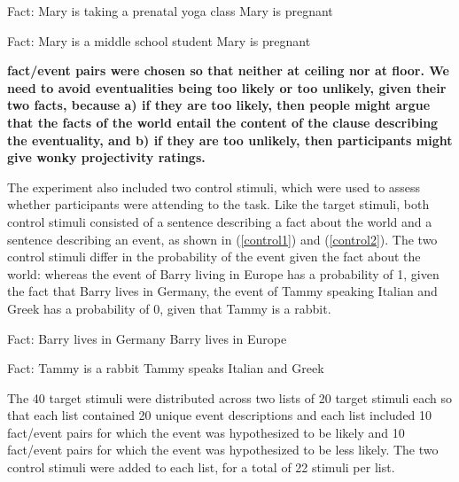 \documentclass[11pt,fleqn]{article}
\newcommand{\6}{\mbox{$[\hspace*{-.6mm}[$}}
\newcommand{\9}{\mbox{$]\hspace*{-.6mm}]$}}
\begin{document}
\begin{exe}
\ex\label{event}
\begin{xlist}
\ex\label{event1}
\begin{xlist}
\ex Fact: Mary is taking a prenatal yoga class
\ex Mary is pregnant
\end{xlist}
\ex\label{event2}
\begin{xlist}
\ex Fact: Mary is a middle school student
\ex Mary is pregnant
\end{xlist}
\end{xlist}
\end{exe}

{\bf fact/event pairs were chosen so that neither at ceiling nor at floor. We need to avoid eventualities being too likely or too unlikely, given their two facts, because a) if they are too likely, then people might argue that the facts of the world entail the content of the clause describing the eventuality, and b) if they are too unlikely, then participants might give wonky projectivity ratings.}

The experiment also included two control stimuli, which were used to assess whether participants were attending to the task. Like the target stimuli, both control stimuli consisted of a sentence describing a fact about the world and a sentence describing an event, as shown in (\ref{control1}) and (\ref{control2}). The two control stimuli differ in the probability of the event given the fact about the world: whereas the event of Barry living in Europe has a probability of 1, given the fact that Barry lives in Germany, the event of Tammy speaking Italian and Greek has a probability of 0, given that Tammy is a rabbit. 

\begin{exe}
\ex\label{control1}
\begin{xlist}
 Fact: Barry lives in Germany 
 Barry lives in Europe 
\end{xlist}
\ex\label{control2}
\begin{xlist}
 Fact: Tammy is a rabbit 
 Tammy speaks Italian and Greek 
\end{xlist}
\end{exe}

The 40 target stimuli were distributed across two lists of 20 target stimuli each so that each list contained 20 unique event descriptions and each list included 10 fact/event pairs for which the event was hypothesized to be likely and 10 fact/event pairs for which the event was hypothesized to be less likely. The two control stimuli were added to each list, for a total of 22 stimuli per list. 
\end{document}
